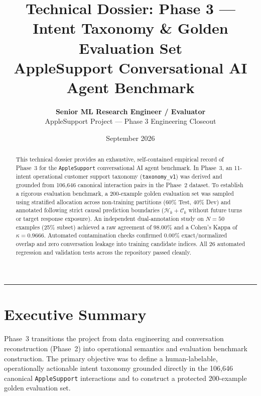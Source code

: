 \documentclass[11pt,a4paper]{article}
\title{\textbf{Technical Dossier: Phase 3 --- Intent Taxonomy \& Golden Evaluation Set}\\
\large AppleSupport Conversational AI Agent Benchmark}
\author{\textbf{Senior ML Research Engineer / Evaluator}\\
AppleSupport Project --- Phase 3 Engineering Closeout}
\date{September 2026}
\begin{document}
\maketitle

\begin{abstract}
This technical dossier provides an exhaustive, self-contained empirical record of Phase~3 for the \texttt{AppleSupport} conversational AI agent benchmark. In Phase~3, an 11-intent operational customer support taxonomy (\texttt{taxonomy\_v1}) was derived and grounded from 106,646 canonical interaction pairs in the Phase~2 dataset. To establish a rigorous evaluation benchmark, a 200-example golden evaluation set was sampled using stratified allocation across non-training partitions (60\% Test, 40\% Dev) and annotated following strict causal prediction boundaries ($\mathcal{H}_k + \mathcal{C}_k$ without future turns or target response exposure). An independent dual-annotation study on $N=50$ examples (25\% subset) achieved a raw agreement of $98.00\%$ and a Cohen's Kappa of $\kappa = 0.9666$. Automated contamination checks confirmed $0.00\%$ exact/normalized overlap and zero conversation leakage into training candidate indices. All 26 automated regression and validation tests across the repository passed cleanly.
\end{abstract}

\vspace{1em}
\hrule
\vspace{1em}

\tableofcontents

\newpage

\section*{Executive Summary}

Phase~3 transitions the project from data engineering and conversation reconstruction (Phase~2) into operational semantics and evaluation benchmark construction. The primary objective was to define a human-labelable, operationally actionable intent taxonomy grounded directly in the 106,646 canonical \texttt{AppleSupport} interactions and to construct a protected 200-example golden evaluation set.
\end{document}
